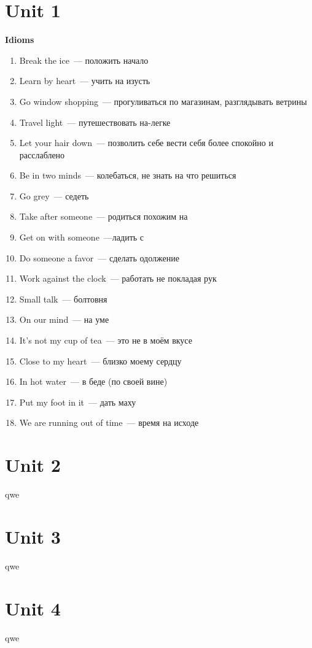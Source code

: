 \documentclass[10pt,a4paper]{article}
\begin{document}
\section{Unit 1}
\textbf{Idioms}

\begin{enumerate}
\itemsep -0.2em
 \item Break the ice~--- положить начало 
 \item Learn by heart~--- учить на изусть
 \item Go window shopping~--- прогуливаться по магазинам, разглядывать ветрины
 \item Travel light~--- путешествовать на-легке
 \item Let your hair down~--- позволить себе вести себя более спокойно и расслаблено
 \item Be in two minds~--- колебаться, не знать на что решиться
 \item Go grey~--- седеть
 \item Take after someone~--- родиться похожим на
 \item Get on with someone~---ладить с 
 \item Do someone a favor~--- сделать одолжение
 \item Work against the clock~--- работать не покладая рук
 \item Small talk~--- болтовня
 \item On our mind~--- на уме
 \item It's not my cup of tea~--- это не в моём вкусе
 \item Close to my heart~--- близко моему сердцу
 \item In hot water~--- в беде (по своей вине)
 \item Put my foot in it~--- дать маху
 \item We are running out of time~--- время на исходе
\end{enumerate}



\section{Unit 2}
qwe



\section{Unit 3}
qwe



\section{Unit 4}
qwe
\end{document}
